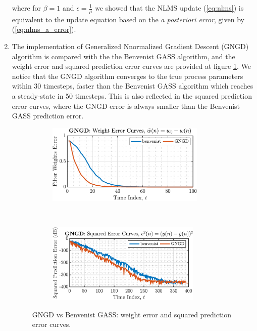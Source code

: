\begin{enumerate}[label=\alph*), leftmargin=*]
where for $\beta = 1$ and $\epsilon = \frac{1}{\mu}$ we showed that the NLMS update (\ref{eq:nlms}) is equivalent to the update equation based on the \textit{a posteriori error},
given by (\ref{eq:nlms_a_error}).

\item
%

The implementation of Generalized Nnormalized Gradient Descent (GNGD) algorithm is compared with the the Benvenist GASS algorithm, and the weight error and squared prediction error curves
are provided at figure \ref{fig:3_2_c}. We notice that the GNGD algorithm converges to the true process parameters within 30 timesteps,
faster than the Benvenist GASS algorithm which reaches a steady-state in 50 timesteps. This is also reflected in the squared prediction error curves,
where the GNGD error is always smaller than the Benvenist GASS prediction error.

\begin{figure}[h]
    \centering
    \begin{subfigure}{0.49\textwidth}
        \centering
        \includegraphics[height=1.5in]{report/adaptive-signal-processing/adaptive-step-sizes/assets/c/weight_error_curves}
    \end{subfigure}
    ~
    \begin{subfigure}{0.49\textwidth}
        \centering
        \includegraphics[height=1.5in]{report/adaptive-signal-processing/adaptive-step-sizes/assets/c/squared_prediction_error}
    \end{subfigure}
    \caption{GNGD vs Benvenist GASS: weight error and squared prediction error curves.}
    \label{fig:3_2_c}
\end{figure}


\end{enumerate}
